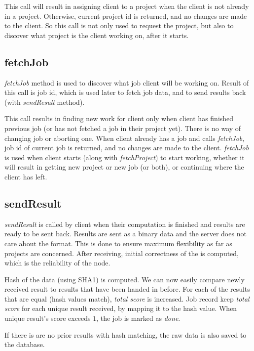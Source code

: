 This call will result in assigning client to a project when the client is not already in a project. Otherwise, current project id is returned, and no changes are made to the client. So this call is not only used to request the project, but also to discover what project is the client working on, after it starts.

\subsection{fetchJob}

\emph{fetchJob} method is used to discover what job client will be working on. Result of this call is job id, which is used later to fetch job data, and to send results back (with \emph{sendResult} method).

This call results in finding new work for client only when client has finished previous job (or has not fetched a job in their project yet). There is no way of changing job or aborting one. When client already has a job and calls \emph{fetchJob}, job id of current job is returned, and no changes are made to the client. \emph{fetchJob} is used when client starts (along with \emph{fetchProject}) to start working, whether it will result in getting new project or new job (or both), or continuing where the client has left.

\subsection{sendResult}

\emph{sendResult} is called by client when their computation is finished and results are ready to be sent back. Results are sent as a binary data and the server does not care about the format. This is done to ensure maximum flexibility as far as projects are concerned. After receiving, initial correctness of the is computed, which is the reliability of the node. 

Hash of the data (using SHA1) is computed. We can now easily compare newly received result to results that have been handed in before. For each of the results that are equal (hash values match), \emph{total score} is increased. Job record keep \emph{total score} for each unique result received, by mapping it to the hash value. When unique result's score exceeds $1$, the job is marked as \emph{done}.

If there is are no prior results with hash matching, the raw data is also saved to the database.

